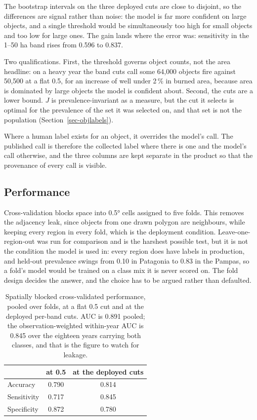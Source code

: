 \documentclass[11pt,a4paper]{article}
\begin{document}
\FloatBarrier

The bootstrap intervals on the three deployed cuts are close to disjoint, so the differences are
signal rather than noise: the model is far more confident on large objects, and a single threshold
would be simultaneously too high for small objects and too low for large ones. The gain lands where
the error was: sensitivity in the 1--50 ha band rises from 0.596 to 0.837.

Two qualifications. First, the threshold governs object counts, not the area headline: on a heavy
year the band cuts call some 64,000 objects fire against 50,500 at a flat 0.5, for an increase of
well under 2\,\% in burned area, because area is dominated by large objects the model is confident
about. Second, the cuts are a lower bound. \(J\) is prevalence-invariant as a measure, but the cut
it selects is optimal for the prevalence of the set it was selected on, and that set is not the
population (Section~\ref{sec-objlabels}).

Where a human label exists for an object, it overrides the model's call. The published call is
therefore the collected label where there is one and the model's call otherwise, and the three
columns are kept separate in the product so that the provenance of every call is visible.

\subsection{Performance}

Cross-validation blocks space into 0.5° cells assigned to five folds. This removes the adjacency
leak, since objects from one drawn polygon are neighbours, while keeping every region in every
fold, which is the deployment condition. Leave-one-region-out was run for comparison and is the
harshest possible test, but it is not the condition the model is used in: every region does have
labels in production, and held-out prevalence swings from 0.10 in Patagonia to 0.83 in the Pampas,
so a fold's model would be trained on a class mix it is never scored on. The fold design decides
the answer, and the choice has to be argued rather than defaulted.

\begin{table}[ht]
\centering
\caption{Spatially blocked cross-validated performance, pooled over folds, at a flat 0.5 cut and at
the deployed per-band cuts. AUC is 0.891 pooled; the observation-weighted within-year AUC is
0.845 over the eighteen years carrying both classes, and that is the figure to watch for leakage.}
\label{tab-cv}
\begin{tabular}{l c c}
\toprule
 & at 0.5 & at the deployed cuts \\
\midrule
Accuracy     & 0.790 & 0.814 \\
Sensitivity  & 0.717 & 0.845 \\
Specificity  & 0.872 & 0.780 \\
\bottomrule
\end{tabular}
\end{table}
\end{document}

